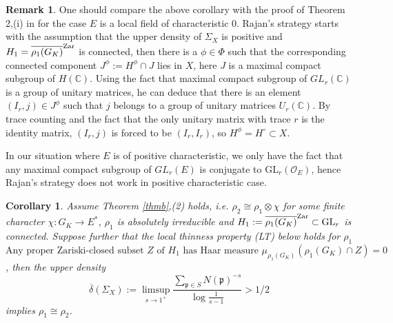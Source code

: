 \documentclass[20pt, oneside]{article}   	%
\newtheorem{cor}[thm]{Corollary}
\theoremstyle{definition}
\newtheorem{rem}[thm]{Remark}
\newcommand{\fp}{\mathfrak{p}}
\newcommand{\GL}{\mathrm{GL}}
\newcommand{\cO}{\mathcal{O}}
\begin{document}
\begin{rem}\label{rem1}
One should compare the above corollary with the proof of Theorem 2,(i) in \cite{Ra98} for the case $E$ is a local field of characteristic $0$. Rajan's strategy starts with the assumption that the upper density of $\Sigma_X$ is positive and $H_1=\overline{\rho_1(G_K)}^{\rm Zar}$ is connected, then there is a $\phi\in\Phi$ such that the corresponding connected component $J^\phi:=H^\phi\cap J$ lies in $X$, here $J$ is a maximal compact subgroup of $H(\mathbb{C})$. Using the fact that maximal compact subgroup of $GL_r(\mathbb{C})$ is a group of unitary matrices, he can deduce that there is an element  $(I_r,j)\in J^\phi$ such that $j$ belongs to a group of unitary matrices $U_r(\mathbb{C})$. By trace counting and the fact that the only unitary matrix with trace $r$ is the identity matrix, $(I_r,j)$ is forced to be $(I_r,I_r)$, so $H^\phi=H^\circ\subset X$.   

In our situation where $E$ is of positive characteristic, we only have the fact that any maximal compact subgroup of $GL_r(E)$ is conjugate to $\GL_r(\cO_E)$, hence Rajan's strategy does not work in positive characteristic case. 


\end{rem}

\begin{cor}\label{cor2}
Assume Theorem \ref{thmb},(2) holds, i.e. $\rho_2\cong\rho_1\otimes \chi$ for some finite character $\chi:G_K\rightarrow E^*$, $\rho_1$ is absolutely irreducible and $H_1:=\overline{\rho_1(G_K)}^{\rm Zar}\subset \GL_r$ is connected. Suppose further that the local thinness property (LT) below holds for $\rho_1$
\begin{equation}\tag{LT}
\textrm{Any proper Zariski-closed subset $Z$ of $H_1$ has Haar measure $\mu_{\rho_1(G_K)}(\rho_1(G_K)\cap Z)=0$}
\end{equation}
, then the upper density $$\overline{\delta}(\Sigma_X):=\limsup_{s\rightarrow 1^+}\frac{\sum_{\fp\in S}N(\fp)^{-s}}{\log \frac{1}{s-1}}>1/2$$ implies $\rho_1\cong\rho_2$.

\end{cor}
\end{document}
